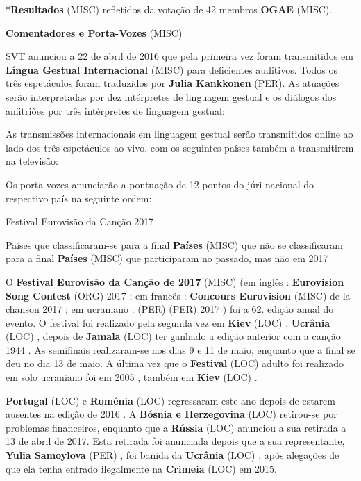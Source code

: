 \documentclass[12pt,a4paper]{article}
\begin{document}
*\textbf{Resultados} (MISC) refletidos da votação de 42 membros \textbf{OGAE} (MISC).



\textbf{Comentadores e Porta-Vozes} (MISC)

SVT anunciou a 22 de abril de 2016 que pela primeira vez foram transmitidos em \textbf{Língua Gestual Internacional} (MISC) para deficientes auditivos. Todos os três espetáculos foram traduzidos por \textbf{Julia Kankkonen} (PER). As atuações serão interpretadas por dez intérpretes de linguagem gestual e os diálogos dos anfitriões por três intérpretes de linguagem gestual:

As transmissões internacionais em linguagem gestual serão transmitidos online ao lado dos três espetáculos ao vivo, com os seguintes países também a transmitirem na televisão:

Os porta-vozes anunciarão a pontuação de 12 pontos do júri nacional do respectivo país na seguinte ordem:



Festival Eurovisão da Canção 2017



Países que classificaram-se para a final \textbf{Países} (MISC) que não se classificaram para a final \textbf{Países} (MISC) que participaram no passado, mas não em 2017

O \textbf{Festival Eurovisão da Canção de 2017} (MISC) (em inglês : \textbf{Eurovision Song Contest} (ORG) 2017 ; em francês : \textbf{Concours Eurovision} (MISC) de la chanson 2017 ; em ucraniano : \textbf{} (PER)  \textbf{} (PER) 2017 ) foi a 62. edição anual do evento. O festival foi realizado pela segunda vez em \textbf{Kiev} (LOC) , \textbf{Ucrânia} (LOC) , depois de \textbf{Jamala} (LOC) ter ganhado a edição anterior com a canção 1944 . As semifinais realizaram-se nos dias 9 e 11 de maio, enquanto que a final se deu no dia 13 de maio. A última vez que o \textbf{Festival} (LOC) adulto foi realizado em solo ucraniano foi em 2005 , também em \textbf{Kiev} (LOC) .

\textbf{Portugal} (LOC) e \textbf{Roménia} (LOC) regressaram este ano depois de estarem ausentes na edição de 2016 . A \textbf{Bósnia e Herzegovina} (LOC) retirou-se por problemas financeiros, enquanto que a \textbf{Rússia} (LOC) anunciou a sua retirada a 13 de abril de 2017. Esta retirada foi anunciada depois que a sua representante, \textbf{Yulia Samoylova} (PER) , foi banida da \textbf{Ucrânia} (LOC) , após alegações de que ela tenha entrado ilegalmente na \textbf{Crimeia} (LOC) em 2015.
\end{document}
